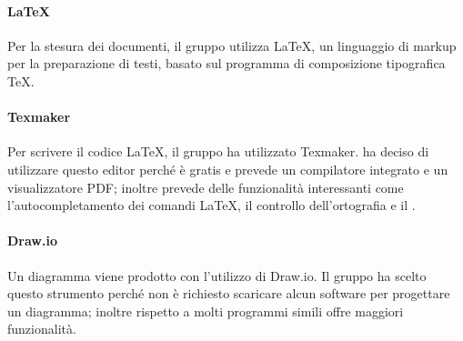 \paragraph{\LaTeX{}}
Per la stesura dei documenti, il gruppo utilizza \LaTeX{}, un linguaggio di markup per la preparazione di testi, basato sul programma di composizione tipografica \TeX{}.

\paragraph{Texmaker}
Per scrivere il codice \LaTeX{}, il gruppo ha utilizzato Texmaker. \Gruppo{} ha deciso di utilizzare questo editor perché è gratis e prevede un compilatore integrato e un visualizzatore PDF; inoltre prevede delle funzionalità interessanti come l'autocompletamento dei comandi \LaTeX{}, il controllo dell'ortografia e il .

\paragraph{Draw.io}
Un diagramma  viene prodotto con l'utilizzo di Draw.io. Il gruppo ha scelto questo strumento perché non è richiesto scaricare alcun software per progettare un diagramma; inoltre rispetto a molti programmi simili offre maggiori funzionalità.